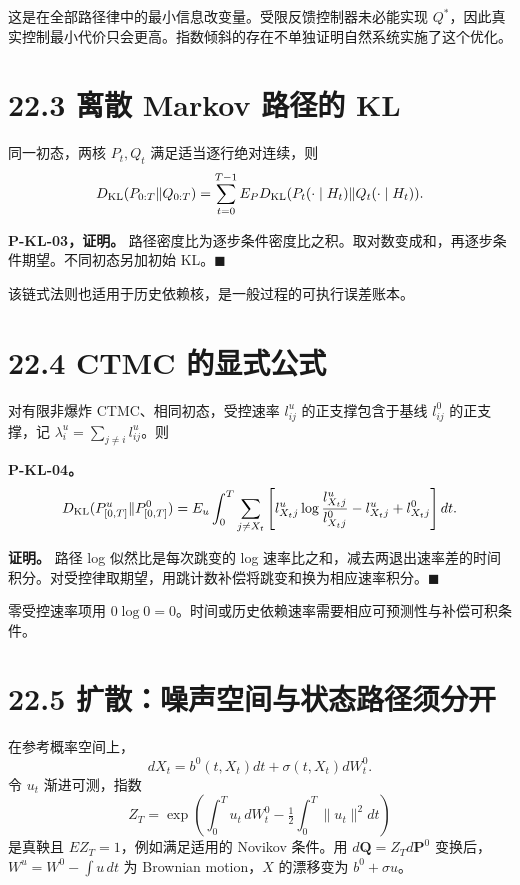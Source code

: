 \documentclass[
  11pt,
  oneside]{book}
\begin{document}
这是在全部路径律中的最小信息改变量。受限反馈控制器未必能实现 \(Q^*\)，因此真实控制最小代价只会更高。指数倾斜的存在不单独证明自然系统实施了这个优化。

\section{22.3 离散 Markov 路径的 KL}\label{ux79bbux6563-markov-ux8defux5f84ux7684-kl}

同一初态，两核 \(P_t,Q_t\) 满足适当逐行绝对连续，则 \[D_{\rm KL}(P_{0:T}\|Q_{0:T})
=\sum_{t=0}^{T-1}E_P
D_{\rm KL}(P_t(\cdot\mid H_t)\|Q_t(\cdot\mid H_t)).\]

\hypertarget{p-kl-03}{}\label{p-kl-03}

\textbf{P-KL-03，证明。} 路径密度比为逐步条件密度比之积。取对数变成和，再逐步条件期望。不同初态另加初始 KL。\(\blacksquare\)

该链式法则也适用于历史依赖核，是一般过程的可执行误差账本。

\section{22.4 CTMC 的显式公式}\label{ctmc-ux7684ux663eux5f0fux516cux5f0f}

对有限非爆炸 CTMC、相同初态，受控速率 \(l^u_{ij}\) 的正支撑包含于基线 \(l^0_{ij}\) 的正支撑，记 \(\lambda_i^u=\sum_{j\ne i}l^u_{ij}\)。则

\hypertarget{p-kl-04}{}\label{p-kl-04}

\textbf{P-KL-04。} \[D_{\rm KL}(P^u_{[0,T]}\|P^0_{[0,T]})
=
E_u\int_0^T
\sum_{j\ne X_t}
\left[
l^u_{X_tj}\log\frac{l^u_{X_tj}}{l^0_{X_tj}}
-l^u_{X_tj}+l^0_{X_tj}
\right]dt.\]

\textbf{证明。} 路径 log 似然比是每次跳变的 log 速率比之和，减去两退出速率差的时间积分。对受控律取期望，用跳计数补偿将跳变和换为相应速率积分。\(\blacksquare\)

零受控速率项用 \(0\log0=0\)。时间或历史依赖速率需要相应可预测性与补偿可积条件。

\section{22.5 扩散：噪声空间与状态路径须分开}\label{ux6269ux6563ux566aux58f0ux7a7aux95f4ux4e0eux72b6ux6001ux8defux5f84ux987bux5206ux5f00}

在参考概率空间上， \[dX_t=b^0(t,X_t)dt+\sigma(t,X_t)dW_t^0.\] 令 \(u_t\) 渐进可测，指数 \[Z_T=\exp\left(\int_0^T u_t\,dW_t^0-
\tfrac12\int_0^T\|u_t\|^2dt\right)\] 是真鞅且 \(EZ_T=1\)，例如满足适用的 Novikov 条件。用 \(d\mathbf Q=Z_Td\mathbf P^0\) 变换后，\(W^u=W^0-\int u\,dt\) 为 Brownian motion，\(X\) 的漂移变为 \(b^0+\sigma u\)。
\end{document}

